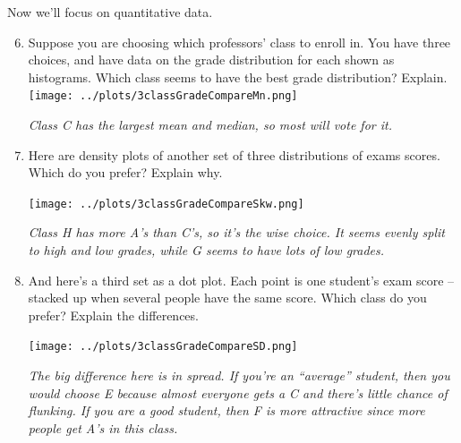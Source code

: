  Now we'll focus on quantitative data.    \vspace{-.3in}
 \begin{enumerate}
\setcounter{enumi}{5}
 \item \label{center}
   Suppose you are choosing which professors' class to enroll
     in.  You have three choices, and have data on the grade
     distribution for each shown as histograms.  
     Which class seems to have the best grade distribution? Explain. \\
  \texttt{[image: ../plots/3classGradeCompareMn.png]}
\begin{students}
    \vspace{2cm}    
\end{students}

\begin{key}
  {\it Class C has the largest mean and median, so most will vote for it. }
\end{key}

\item  \label{skew} Here are density plots of  another set of three
  distributions of exams scores. Which do you prefer?  Explain why. 

   \texttt{[image: ../plots/3classGradeCompareSkw.png]}
\begin{students}
    \vspace{2cm}   
\end{students}

\begin{key}
  {\it Class H has more A's than C's, so it's the wise choice.  It
    seems evenly split to high and low grades, while G seems to have
    lots of low grades.}
\end{key}

    
   \item  \label{spread}And here's a third set as a dot plot. Each point is one
     student's exam score -- stacked up when several people have the
     same score.   Which class do you prefer?  Explain the
     differences.  
     
    \texttt{[image: ../plots/3classGradeCompareSD.png]}
\begin{students}
    \vspace{2cm}
\end{students}

\begin{key}
  {\it The big difference here is in spread.  If you're an ``average''
  student, then you would choose E because almost everyone gets a C and
  there's little chance of flunking.  If you are a good student, then
  F is more attractive since more people get A's in this class.}
\end{key}



\end{enumerate}
